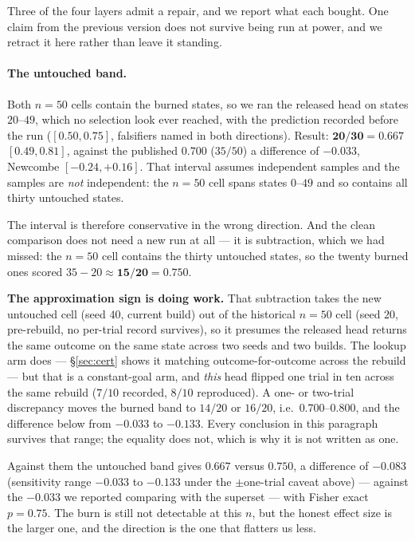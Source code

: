 \documentclass[10pt,twocolumn]{article}
\begin{document}
Three of the four layers admit a repair, and we report what each bought. One
claim from the previous version does not survive being run at power, and we
retract it here rather than leave it standing.

\paragraph{The untouched band.} Both $n{=}50$ cells contain the burned states,
so we ran the released head on states $20$--$49$, which no selection look ever
reached, with the prediction recorded before the run ($[0.50,0.75]$, falsifiers
named in both directions). Result: $\mathbf{20/30 = 0.667}$ $[0.49,0.81]$,
against the published $0.700$ ($35/50$) a difference of $-0.033$, Newcombe
$[-0.24,+0.16]$. That interval assumes independent samples and the samples are
\emph{not} independent: the $n{=}50$ cell spans states $0$--$49$ and so contains
all thirty untouched states.

The interval is therefore conservative in the wrong direction. And the clean
comparison does not need a new run at all --- it is subtraction, which we had
missed: the $n{=}50$ cell contains the thirty untouched states, so the twenty
burned ones scored $35 - 20 \approx \mathbf{15/20 = 0.750}$.

\textbf{The approximation sign is doing work.} That subtraction takes the
new untouched cell (seed $40$, current build) out of the historical $n{=}50$
cell (seed $20$, pre-rebuild, no per-trial record survives), so it presumes the
released head returns the same outcome on the same state across two seeds and
two builds. The lookup arm does --- \S\ref{sec:cert} shows it matching
outcome-for-outcome across the rebuild --- but that is a constant-goal arm, and
\emph{this} head flipped one trial in ten across the same rebuild ($7/10$
recorded, $8/10$ reproduced). A one- or two-trial discrepancy moves the burned
band to $14/20$ or $16/20$, i.e.\ $0.700$--$0.800$, and the difference below
from $-0.033$ to $-0.133$. Every conclusion in this paragraph survives that
range; the equality does not, which is why it is not written as one.

Against them the untouched band gives $0.667$ versus $0.750$, a difference of
$\mathbf{-0.083}$ (sensitivity range $-0.033$ to $-0.133$ under the
$\pm$one-trial caveat above) --- against the $-0.033$ we reported comparing
with the superset --- with Fisher exact $p = 0.75$. The burn is still not detectable at
this $n$, but the honest effect size is the larger one, and the direction is
the one that flatters us less.
\end{document}
